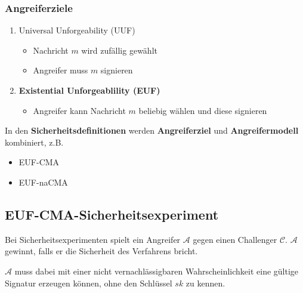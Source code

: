 \documentclass[12pt,A4]{extarticle}
\newcommand{\highlight}[1]{\textcolor{highlightColor}{\textbf{#1}}}
\begin{document}
\subsubsection{Angreiferziele}
\begin{enumerate}
  \item{Universal Unforgeability (UUF)
              \begin{itemize}
                \item{Nachricht $m$ wird zufällig gewählt}
                \item{Angreifer muss $m$ signieren}
              \end{itemize}
        }
  \item{\highlight{Existential Unforgeablility (EUF)}
              \begin{itemize}
                \item{Angreifer kann Nachricht $m$ beliebig wählen und diese signieren}
              \end{itemize}
        }
\end{enumerate}

In den \textbf{Sicherheitsdefinitionen} werden \textbf{Angreiferziel} und \textbf{Angreifermodell} kombiniert, z.B.
\begin{itemize}
  \item{EUF-CMA}
  \item{EUF-naCMA}
\end{itemize}

\subsection{EUF-CMA-Sicherheitsexperiment}
Bei Sicherheitsexperimenten spielt ein Angreifer $\mathcal{A}$ gegen einen Challenger $\mathcal{C}$. $\mathcal{A}$ gewinnt, falls er die Sicherheit des Verfahrens bricht.\par
$\mathcal{A}$ muss dabei mit einer nicht vernachlässigbaren Wahrscheinlichkeit eine gültige Signatur erzeugen können, ohne den Schlüssel $sk$ zu kennen.
\end{document}
